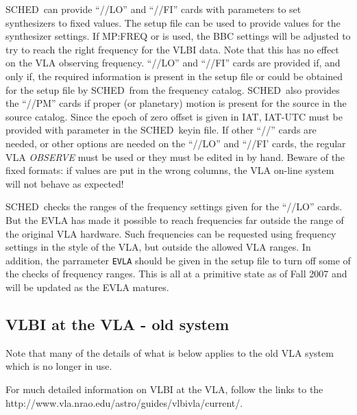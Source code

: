 \documentclass{report}
\newcommand{\schedb}{{\sc SCHED~}}
\begin{document}
\schedb can provide ``//LO'' and ``//FI'' cards with parameters to set
synthesizers to fixed values. The setup file can be used to provide
values for the synthesizer settings. If  {MP:FREQ}
or  is used, the BBC settings will
be adjusted to try to reach the right frequency for the VLBI
data. Note that this has no effect on the VLA observing
frequency. ``//LO'' and ``//FI'' cards are provided if, and only if,
the required information is present in the setup file or could be
obtained for the setup file by \schedb from the frequency catalog.
\schedb also provides the ``//PM'' cards if proper (or planetary)
motion is present for the source in the source catalog. Since the
epoch of zero offset is given in IAT, IAT-UTC must be provided with
parameter  in the \schedb keyin
file. If other ``//'' cards are needed, or other options are needed on
the ``//LO'' and ``//FI' cards, the regular VLA {\sl OBSERVE} must be
used or they must be edited in by hand. Beware of the fixed formats:
if values are put in the wrong columns, the VLA on-line system will
not behave as expected!

\schedb checks the ranges of the frequency settings given for the
``//LO'' cards.  But the EVLA has made it possible to reach
frequencies far outside the range of the original VLA hardware.  Such
frequencies can be requested using frequency settings in the style of
the VLA, but outside the allowed VLA ranges.  In addition, the
parrameter {\tt EVLA} should be given in the setup
file to turn off some of the checks of frequency ranges.  This is all
at a primitive state as of Fall 2007 and will be updated as the EVLA
matures.

\subsection{\label{SSEC:VLAVLBIOLD}VLBI at the VLA - old system}

Note that many of the details of what is below applies to the old VLA
system which is no longer in use.  

For much detailed information on VLBI at the VLA, follow the links to
the 
{http://www.vla.nrao.edu/astro/guides/vlbivla/current/}.
\end{document}
